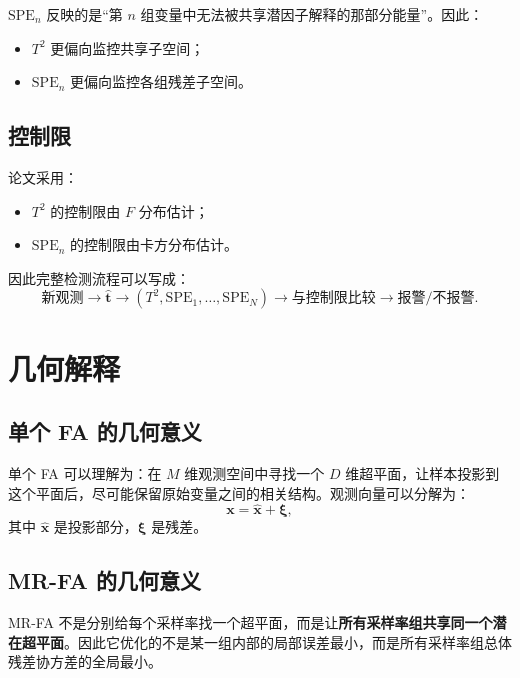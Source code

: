 \documentclass[UTF8]{ctexart}
\begin{document}
$\mathrm{SPE}_n$ 反映的是“第 $n$ 组变量中无法被共享潜因子解释的那部分能量”。因此：
\begin{itemize}
    \item $T^2$ 更偏向监控共享子空间；
    \item $\mathrm{SPE}_n$ 更偏向监控各组残差子空间。
\end{itemize}

\subsection{控制限}

论文采用：
\begin{itemize}
    \item $T^2$ 的控制限由 $F$ 分布估计；
    \item $\mathrm{SPE}_n$ 的控制限由卡方分布估计。
\end{itemize}

因此完整检测流程可以写成：
\begin{equation}
    \text{新观测}
    \rightarrow
    \hat{\bm{t}}
    \rightarrow
    \left(T^2,\mathrm{SPE}_1,\dots,\mathrm{SPE}_N\right)
    \rightarrow
    \text{与控制限比较}
    \rightarrow
    \text{报警/不报警}.
\end{equation}

\section{几何解释}

\subsection{单个 FA 的几何意义}

单个 FA 可以理解为：在 $M$ 维观测空间中寻找一个 $D$ 维超平面，让样本投影到这个平面后，尽可能保留原始变量之间的相关结构。观测向量可以分解为：
\begin{equation}
    \bm{x} = \hat{\bm{x}} + \bm{\xi},
\end{equation}
其中 $\hat{\bm{x}}$ 是投影部分，$\bm{\xi}$ 是残差。

\subsection{MR-FA 的几何意义}

MR-FA 不是分别给每个采样率找一个超平面，而是让\textbf{所有采样率组共享同一个潜在超平面}。因此它优化的不是某一组内部的局部误差最小，而是所有采样率组总体残差协方差的全局最小。
\end{document}
